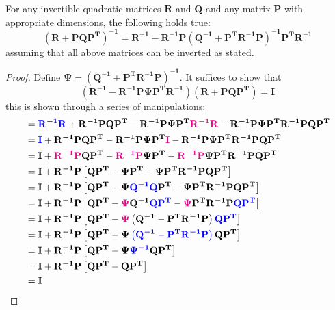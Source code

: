 \documentclass[12pt]{article}
\newcommand{\mat}[1]{\boldsymbol{\mathbf{#1}}}
\newcommand{\matT}[1]{\boldsymbol{\mathbf{#1^T}}}
\newcommand{\parentheses}[1]{\left(#1\right)}
\newcommand{\blue}[1]{\color{blue}#1\color{black}}
\newcommand{\magenta}[1]{\color{magenta}#1\color{black}}
\begin{document}
\begin{lem}
For any invertible quadratic matrices $\mat{R}$ and $\mat{Q}$ and any matrix $\mat{P}$ with appropriate dimensions, the following holds true:
\begin{equation}
\parentheses{\mat{R} + \mat{PQ}\matT{P}}^\mathbf{{-1}} = \mat{R^{-1}} - \mat{R^{-1}}\mat{P}\parentheses{\mat{Q^{-1}} + \matT{P}\mat{R^{-1}P}}^\mathbf{{-1}}\matT{P}\mat{R^{-1}}
\end{equation}
assuming that all above matrices can be inverted as stated.

\begin{proof}
Define $\mat{\Psi} = \parentheses{\mat{Q^{-1}} + \matT{P}\mat{R^{-1}}\mat{P}}^\mathbf{-1}$. It suffices to show that
\begin{equation*}
\parentheses{\mat{R^{-1}} - \mat{R^{-1}}\mat{P}\mat{\Psi}\matT{P}\mat{R^{-1}}} \parentheses{\mat{R} + \mat{PQ}\matT{P}} = \mat{I}
\end{equation*}
this is shown through a series of manipulations:
\begin{equation}
\begin{aligned}
    &= \blue{\mat{R^{-1} R}} + \mat{R^{-1} P Q P^T} - \mat{R^{-1} P \Psi P^T \magenta{R^{-1} R}} - \mat{R^{-1} P \Psi P^T R^{-1} P Q P^T} \\
    &= \blue{\mat{I}} + \mat{R^{-1} P Q P^T} - \mat{R^{-1} P \Psi P^T \magenta{I}} - \mat{R^{-1} P \Psi P^T R^{-1} P Q P^T}\\
    &= \mat{I} + \mat{\magenta{R^{-1} P} Q P^T} - \mat{\magenta{R^{-1} P} \Psi P^T} - \mat{\magenta{R^{-1} P} \Psi P^T R^{-1} P Q P^T}\\
    &= \mat{I} + \mat{R^{-1} P} \left[\mat{Q P^T} - \mat{\Psi P^T} - \mat{\Psi P^T R^{-1} P Q P^T}\right]\\
    &= \mat{I} + \mat{R^{-1} P} \left[\mat{Q P^T} - \mat{\Psi \blue{Q^{-1} Q} P^T} - \mat{\Psi P^T R^{-1} P Q P^T}\right]\\
    &= \mat{I} + \mat{R^{-1} P} \left[\mat{Q P^T} - \mat{\magenta{\Psi} Q^{-1}\blue{ Q P^T}} - \mat{\magenta{\Psi} P^T R^{-1} P \blue{Q P^T}}\right]\\
    &= \mat{I} + \mat{R^{-1} P} \left[\mat{Q P^T} - \mat{\magenta{\Psi}} \left(\mat{ Q^{-1}} - \mat{P^T R^{-1} P}\right)\mat{\blue{Q P^T}}\right]\\
    &= \mat{I} + \mat{R^{-1} P} \left[\mat{Q P^T} - \mat{\Psi} \blue{\left(\mat{ Q^{-1}} - \mat{P^T R^{-1} P}\right)}\mat{Q P^T}\right]\\
    &= \mat{I} + \mat{R^{-1} P} \left[\mat{Q P^T} - \mat{\Psi} \blue{\mat{\Psi^{-1}}}\mat{Q P^T}\right]\\
    &= \mat{I} + \mat{R^{-1} P} \left[\mat{Q P^T} - \mat{Q P^T}\right]\\
    &= \mat{I} 
\end{aligned}
\end{equation}

\end{proof}
\label{lem:inversion-lemma}

\end{lem}



\end{document}
